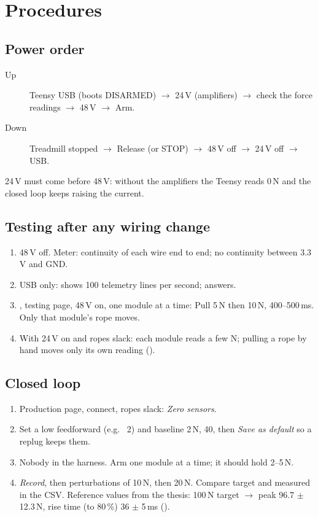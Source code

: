 \section{Procedures}

\subsection{Power order}
\begin{description}
\item[Up] Teensy USB (boots DISARMED) $\rightarrow$ 24\,V (amplifiers) $\rightarrow$ check the force readings
$\rightarrow$ 48\,V $\rightarrow$ Arm.
\item[Down] Treadmill stopped $\rightarrow$ Release (or STOP) $\rightarrow$ 48\,V off $\rightarrow$ 24\,V off
$\rightarrow$ USB.
\end{description}
24\,V must come before 48\,V: without the amplifiers the Teensy reads 0\,N and the closed loop keeps raising
the current.

\subsection{Testing after any wiring change}
\begin{enumerate}
\item 48\,V off. Meter: continuity of each wire end to end; no continuity between 3.3\,V and GND.
\item USB only:  shows 100 telemetry lines per second; 
answers.
\item {}, testing page, 48\,V on, one module at a time: Pull 5\,N then 10\,N,
400--500\,ms. Only that module's rope moves.
\item With 24\,V on and ropes slack: each module reads a few N; pulling a rope by hand moves only its own
reading ().
\end{enumerate}

\subsection{Closed loop}
\begin{enumerate}
\item Production page, connect, ropes slack: \emph{Zero sensors}.
\item Set a low feedforward (e.g.\  2) and baseline 2\,N,  40, then \emph{Save as
default} so a replug keeps them.
\item Nobody in the harness. Arm one module at a time; it should hold 2--5\,N.
\item \emph{Record}, then perturbations of 10\,N, then 20\,N. Compare target and measured in the CSV.
Reference values from the thesis: 100\,N target $\rightarrow$ peak 96.7 $\pm$ 12.3\,N, rise time (to 80\,\%)
36 $\pm$ 5\,ms ().
\end{enumerate}

